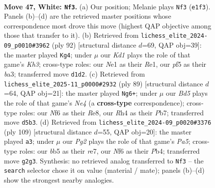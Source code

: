 \documentclass[11pt]{article}
\begin{document}
\clearpage

\begin{figure}[p]\centering
\begin{subfigure}{0.46\textwidth}\centering
\resizebox{\linewidth}{!}{%
\newchessgame
\chessboard[
  setfen={1k3r2/8/5N2/1b1Brp2/1P5R/8/2R3P1/3KN3 w - - 9 47},
  showmover=false,
  pgfstyle=straightmove, color=movearrow, markmove={e1-f3}
]}
\caption{}
\end{subfigure}\hfill
\begin{subfigure}{0.46\textwidth}\centering
\resizebox{\linewidth}{!}{%
\newchessgame
\chessboard[
  setfen={8/5k2/8/3r4/p1pBN3/brPb1P1K/5R2/4R3 w - - 0 47},
  showmover=false,
  pgfstyle=straightmove, color=movearrow, markmove={h3-g4}
]}
\caption{}
\end{subfigure}
\\[4pt]
\begin{subfigure}{0.46\textwidth}\centering
\resizebox{\linewidth}{!}{%
\newchessgame
\chessboard[
  setfen={4r3/1p3k2/3B4/2P1n3/p6R/4Kb1P/8/R7 b - - 0 45},
  showmover=false,
  pgfstyle=straightmove, color=movearrow, markmove={e5-g6}
]}
\caption{}
\end{subfigure}\hfill
\begin{subfigure}{0.46\textwidth}\centering
\resizebox{\linewidth}{!}{%
\newchessgame
\chessboard[
  setfen={8/4R3/8/1k6/pp1r1nP1/2n2P2/2R4K/8 b - - 6 55},
  showmover=false,
  pgfstyle=straightmove, color=movearrow, markmove={a4-a3}
]}
\caption{}
\end{subfigure}
\caption{\textbf{Move 47, White: \texttt{Nf3}.} (a) Our position; Melanie plays \texttt{Nf3} (\texttt{e1f3}). Panels (b)--(d) are the retrieved master positions whose correspondence most drove this move (highest QAP objective among those that transfer to it). (b) Retrieved from \texttt{lichess\_elite\_2024-09\_p0010\#3962} (ply 92) [structural distance $d$=69, QAP obj=39]: the master played \texttt{Kg4}; under $\mu$ our \emph{Kd1} plays the role of that game's \emph{Kh3}; cross-type roles: our \emph{N}e1 as their \emph{R}e1, our \emph{p}f5 as their \emph{b}a3; transferred move \texttt{d1d2}. (c) Retrieved from \texttt{lichess\_elite\_2025-11\_p0000\#2932} (ply 89) [structural distance $d$=64, QAP obj=21]: the master played \texttt{Ng6+}; under $\mu$ our \emph{Bd5} plays the role of that game's \emph{Ne4} (a \textbf{cross-type} correspondence); cross-type roles: our \emph{N}f6 as their \emph{R}e8, our \emph{R}h4 as their \emph{P}b7; transferred move \texttt{d5b3}. (d) Retrieved from \texttt{lichess\_elite\_2024-09\_p0020\#3376} (ply 109) [structural distance $d$=55, QAP obj=20]: the master played \texttt{a3}; under $\mu$ our \emph{Pg2} plays the role of that game's \emph{Pa5}; cross-type roles: our \emph{b}b5 as their \emph{r}e7, our \emph{N}f6 as their \emph{P}b4; transferred move \texttt{g2g3}. Synthesis: no retrieved analog transferred to \texttt{Nf3} -- the \texttt{search} selector chose it on value (material / mate); panels (b)--(d) show the strongest nearby analogies.}
\label{fig:thought-m92}
\end{figure}
\end{document}
